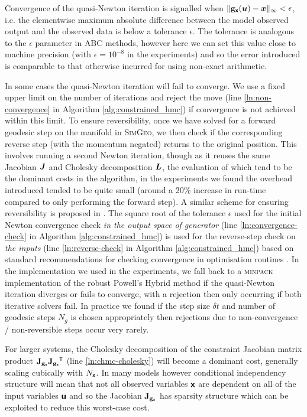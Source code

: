 Convergence of the quasi-Newton iteration is signalled when $\Vert {\mathbf{g}}_{\boldsymbol{\mathsf{x}}}(\boldsymbol{u}) - \boldsymbol{x}\Vert_\infty < \epsilon$, i.e. the elementwise maximum absolute difference between the model observed output and the observed data is below a tolerance $\epsilon$. The tolerance is analogous to the $\epsilon$ parameter in \ac{ABC} methods, however here we can set this value close to machine precision (with $\epsilon = 10^{-8}$ in the experiments) and so the error introduced is comparable to that otherwise incurred for using non-exact arithmetic.

In some cases the quasi-Newton iteration will fail to converge. We use a fixed upper limit on the number of iterations and reject the move (line \ref{ln:non-convergence} in Algorithm \ref{alg:constrained_hmc}) if convergence is not achieved within this limit. To ensure reversibility, once we have solved for a forward geodesic step on the manifold in \textsc{SimGeo}, we then check if the corresponding reverse step (with the momentum negated) returns to the original position. This involves running a second Newton iteration, though as it reuses the same Jacobian $\boldsymbol{J}$ and Cholesky decomposition $\boldsymbol{L}$, the evaluation of which tend to be the dominant costs in the algorithm, in the experiments we found the overhead introduced tended to be quite small (around a 20\% increase in run-time compared to only performing the forward step). A similar scheme for ensuring reversibility is proposed in \citep{zappa2017monte}. The square root of the tolerance $\epsilon$ used for the initial Newton convergence check \emph{in the output space of generator} (line \ref{ln:convergence-check} in Algorithm \ref{alg:constrained_hmc}) is used for the reverse-step check on \emph{the inputs} (line \ref{ln:reverse-check} in Algorithm \ref{alg:constrained_hmc}) based on standard recommendations for checking convergence in optimisation routines \citep{christensen2008devil}. In the implementation we used in the experiments, we fall back to a \textsc{minpack} \citep{more1980user} implementation of the robust Powell's Hybrid method \citep{powell1970hybrid} if the quasi-Newton iteration diverges or fails to converge, with a rejection then only occurring if both iterative solvers fail. In practice we found if the step size $\delta t$ and number of geodesic steps $N_g$ is chosen appropriately then rejections due to non-convergence / non-reversible steps occur very rarely.

For larger systems, the Cholesky decomposition of the constraint Jacobian matrix product $\mathbf{J}_{{\mathbf{g}}_{\boldsymbol{\mathsf{x}}}}\mathbf{J}_{{\mathbf{g}}_{\boldsymbol{\mathsf{x}}}}\phantom{}^{\mkern-1.5mu\mathsf{T}}$ (line \ref{ln:chmc-cholesky}) will become a dominant cost, generally scaling cubically with $N_{\boldsymbol{\mathsf{x}}}$. In many models however conditional independency structure will mean that not all observed variables $\boldsymbol{\mathsf{x}}$ are dependent on all of the input variables $\boldsymbol{\mathsf{u}}$ and so the Jacobian $\mathbf{J}_{{\mathbf{g}}_{\boldsymbol{\mathsf{x}}}}$ has sparsity structure which can be exploited to reduce this worst-case cost. 

